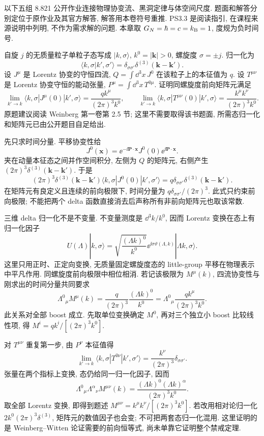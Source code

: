 以下五组 8.821 公开作业连接物理协变流、黑洞定律与体空间尺度. 题面和解答分别定位于原作业及其官方解答, 解答用本卷符号重推. PS3.3 是阅读指引, 在课程来源说明中列明, 不作为需求解的问题. 本章取 $G_N=\hbar=c=k_{\mathrm B}=1$, 度规为负时间号.

\begin{exercise}
自旋 $j$ 的无质量粒子单粒子态写成 $|k,\sigma\rangle$, $k^0=|\mathbf k|>0$, 螺旋度 $\sigma=\pm j$. 归一化为
\[
\langle k,\sigma|k',\sigma'\rangle
=\delta_{\sigma\sigma'}\delta^{(3)}(\mathbf k-\mathbf k').
\]
设 $J^\mu$ 是 Lorentz 协变的守恒四流, $Q=\int\dd^3x\,J^0$ 在该粒子上的本征值为 $q$. 设 $T^{\mu\nu}$ 是 Lorentz 协变守恒的能动张量, $P^\mu=\int\dd^3x\,T^{0\mu}$. 证明同螺旋度前向矩阵元满足
\[
\lim_{k'\to k}\langle k,\sigma|J^\mu(0)|k',\sigma\rangle
=\frac{qk^\mu}{(2\pi)^3k^0},\qquad
\lim_{k'\to k}\langle k,\sigma|T^{\mu\nu}(0)|k',\sigma\rangle
=\frac{k^\mu k^\nu}{(2\pi)^3k^0}.
\]
原题建议阅读 Weinberg 第一卷第 2.5 节; 这里不需要取得该书题面, 所需态归一化和矩阵元已由公开题目自足给出.
\end{exercise}
\begin{solution}
先只求时间分量. 平移协变性给
\[
J^0(\mathbf x)=\ee^{-\ii\mathbf P\cdot\mathbf x}J^0(0)
\ee^{\ii\mathbf P\cdot\mathbf x}.
\]
夹在动量本征态之间并作空间积分, 左侧为 $Q$ 的矩阵元, 右侧产生 $(2\pi)^3\delta^{(3)}(\mathbf k-\mathbf k')$. 于是
\[
(2\pi)^3\delta^{(3)}(\mathbf k-\mathbf k')
\langle k,\sigma|J^0(0)|k',\sigma'\rangle
=q\delta_{\sigma\sigma'}\delta^{(3)}(\mathbf k-\mathbf k').
\]
在矩阵元有良定义且连续的前向极限下, 时间分量为 $q\delta_{\sigma\sigma'}/(2\pi)^3$. 此式只约束前向极限; 不能把两个 delta 函数直接消去后声称所有非前向矩阵元也取该常数.

三维 delta 归一化不是不变量. 不变量测度是 $\dd^3k/k^0$, 因而 Lorentz 变换在态上有归一化因子
\[
U(\Lambda)|k,\sigma\rangle
=\sqrt{\frac{(\Lambda k)^0}{k^0}}
\ee^{\ii\sigma\vartheta(\Lambda,k)}|\Lambda k,\sigma\rangle.
\]
这里只用正时、正定向变换, 无质量固定螺旋度态的 little-group 平移在物理表示中平凡作用. 同螺旋度前向极限中相位相消. 若记该极限为 $M^\mu(k)$, 四流协变性与刚求出的时间分量共同要求
\[
\Lambda^0{}_{\mu}M^\mu(k)
=\frac{q}{(2\pi)^3}\frac{(\Lambda k)^0}{k^0}
=\Lambda^0{}_{\mu}\frac{qk^\mu}{(2\pi)^3k^0}.
\]
此关系对全部 boost 成立. 先取单位变换确定 $M^0$, 再对三个独立小 boost 比较线性项, 得 $M^i=qk^i/[(2\pi)^3k^0]$.

对 $T^{\mu\nu}$ 重复第一步, 由 $P^\nu$ 本征值得
\[
\lim_{k'\to k}\langle k,\sigma|T^{0\nu}|k',\sigma'\rangle
=\frac{k^\nu}{(2\pi)^3}\delta_{\sigma\sigma'}.
\]
张量在两个指标上变换, 态仍给同一归一化因子, 因而
\[
\Lambda^0{}_{\mu}\Lambda^\alpha{}_{\nu}M^{\mu\nu}(k)
=\frac{(\Lambda k)^0(\Lambda k)^\alpha}{(2\pi)^3k^0}.
\]
取全部 Lorentz 变换, 即得到题述 $M^{\mu\nu}=k^\mu k^\nu/[(2\pi)^3k^0]$. 若改用相对论归一化 $2k^0(2\pi)^3\delta^{(3)}$, 矩阵元的数值因子也会变; 不可把两套态归一化混用. 这里证明的是 Weinberg--Witten 论证需要的前向恒等式, 尚未单靠它证明整个禁戒定理.
\end{solution}

